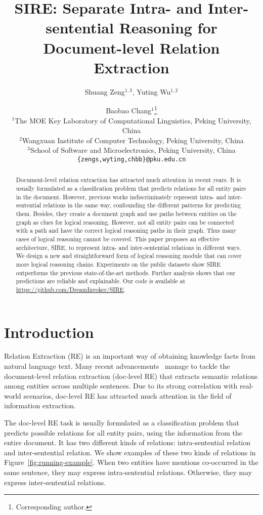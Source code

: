 \documentclass[11pt,a4paper]{article}
\title{SIRE: Separate Intra- and Inter-sentential Reasoning for\\Document-level Relation Extraction}
\author{
  Shuang Zeng$^{1,3}$,
  Yuting Wu$^{1,2}$\and
  Baobao Chang$^{1}$\thanks{\;\;Corresponding author.} \\
  $^{1}$The MOE Key Laboratory of Computational Linguistics, Peking University, China \\
  $^{2}$Wangxuan Institute of Computer Technology, Peking University, China\\
  $^{3}$School of Software and Microelectronics, Peking University, China\\
  \texttt{
    \{zengs,wyting,chbb\}@pku.edu.cn
  }
}
\date{}
\begin{document}
\maketitle



\begin{abstract}
Document-level relation extraction has attracted much attention in recent years. It is usually formulated as a classification problem that predicts relations for all entity pairs in the document. However, previous works indiscriminately represent intra- and inter-sentential relations in the same way, confounding the different patterns for predicting them. Besides, they create a document graph and use paths between entities on the graph as clues for logical reasoning. However, not all entity pairs can be connected with a path and have the correct logical reasoning paths in their graph. Thus many cases of logical reasoning cannot be covered. This paper proposes an effective architecture, SIRE, to represent intra- and inter-sentential relations in different ways. We design a new and straightforward form of logical reasoning module that can cover more logical reasoning chains. Experiments on the public datasets show SIRE outperforms the previous state-of-the-art methods. 
Further analysis shows that our predictions are reliable and explainable. Our code is available at \url{https://github.com/DreamInvoker/SIRE}.

\end{abstract}
 \section{Introduction\label{sec:introduction}}

Relation Extraction (RE) is an important way of obtaining knowledge facts from natural language text. Many recent advancements~\citep{inter, EoG, DocRED-paper, LSR, GAIN, GLRE} manage to tackle the document-level relation extraction (doc-level RE) that extracts semantic relations among entities across multiple sentences. Due to its strong correlation with real-world scenarios, doc-level RE has attracted much attention in the field of information extraction. 

The doc-level RE task is usually formulated as a classification problem that predicts possible relations for all entity pairs, using the information from the entire document.
It has two different kinds of relations: intra-sentential relation and inter-sentential relation. We show examples of these two kinds of relations in Figure~\ref{fig:running-example}. When two entities have mentions co-occurred in the same sentence, they may express intra-sentential relations. Otherwise, they may express inter-sentential relations. 
\end{document}
